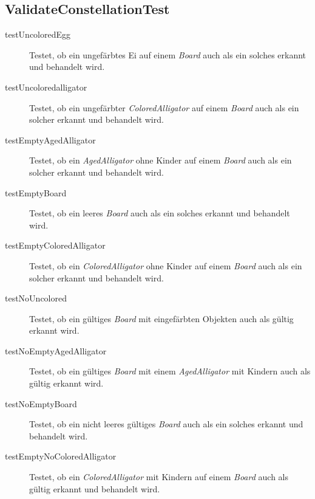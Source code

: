 \subsection{ValidateConstellationTest}
	\begin{description}
		\item[testUncoloredEgg] Testet, ob ein ungefärbtes Ei auf einem \emph{Board} auch als ein solches erkannt und 
			behandelt wird.
		\item[testUncoloredalligator] Testet, ob ein ungefärbter \emph{ColoredAlligator} auf einem \emph{Board} auch als 
			ein solcher erkannt und behandelt wird.
		\item[testEmptyAgedAlligator] Testet, ob ein \emph{AgedAlligator} ohne Kinder auf einem \emph{Board} auch als 
			ein solcher erkannt und behandelt wird.
		\item[testEmptyBoard] Testet, ob ein leeres \emph{Board} auch als ein solches erkannt und behandelt wird.
		\item[testEmptyColoredAlligator] Testet, ob ein \emph{ColoredAlligator} ohne Kinder auf einem \emph{Board} auch 
			als ein solcher erkannt und behandelt wird.
		\item[testNoUncolored] Testet, ob ein gültiges \emph{Board} mit eingefärbten Objekten auch als gültig erkannt 
			wird.
		\item[testNoEmptyAgedAlligator] Testet, ob ein gültiges \emph{Board} mit einem \emph{AgedAlligator} mit Kindern 
			auch als gültig erkannt wird.
		\item[testNoEmptyBoard] Testet, ob ein nicht leeres gültiges \emph{Board} auch als ein solches erkannt und 
			behandelt wird.
		\item[testEmptyNoColoredAlligator] Testet, ob ein \emph{ColoredAlligator} mit Kindern auf einem \emph{Board} 
			auch als gültig erkannt und behandelt wird.
	\end{description}
